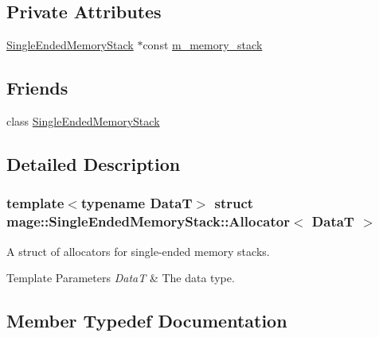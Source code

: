 \subsection*{Private Attributes}
\begin{DoxyCompactItemize}
\item 
\hyperlink{classmage_1_1_single_ended_memory_stack}{Single\+Ended\+Memory\+Stack} $\ast$const \hyperlink{structmage_1_1_single_ended_memory_stack_1_1_allocator_a15ef2935cbc1a207892f25148c05c45d}{m\+\_\+memory\+\_\+stack}
\end{DoxyCompactItemize}
\subsection*{Friends}
\begin{DoxyCompactItemize}
\item 
class \hyperlink{structmage_1_1_single_ended_memory_stack_1_1_allocator_a3f3449e5c2caa1666a293b36db6f5a54}{Single\+Ended\+Memory\+Stack}
\end{DoxyCompactItemize}


\subsection{Detailed Description}
\subsubsection*{template$<$typename DataT$>$\newline
struct mage\+::\+Single\+Ended\+Memory\+Stack\+::\+Allocator$<$ Data\+T $>$}

A struct of allocators for single-\/ended memory stacks.


\begin{DoxyTemplParams}{Template Parameters}
{\em DataT} & The data type. \\
\hline
\end{DoxyTemplParams}


\subsection{Member Typedef Documentation}
\hypertarget{structmage_1_1_single_ended_memory_stack_1_1_allocator_aaa595b8cfde6f045e5f87e5662b549f6}{}\label{structmage_1_1_single_ended_memory_stack_1_1_allocator_aaa595b8cfde6f045e5f87e5662b549f6} 

